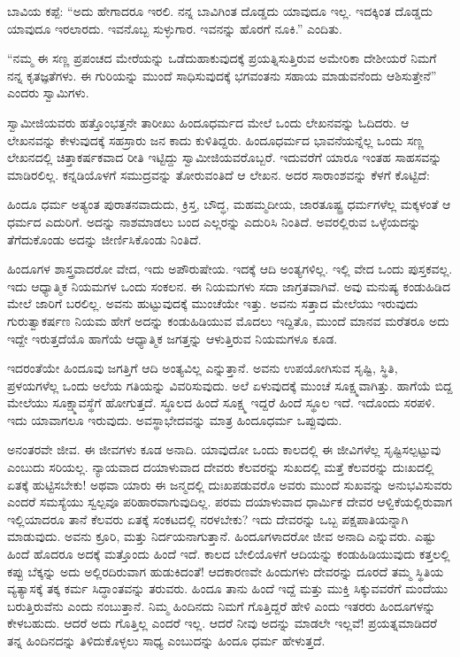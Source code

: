  ಬಾವಿಯ ಕಪ್ಪೆ: “ಅದು ಹೇಗಾದರೂ ಇರಲಿ. ನನ್ನ ಬಾವಿಗಿಂತ ದೊಡ್ಡದು ಯಾವುದೂ ಇಲ್ಲ. ಇದಕ್ಕಿಂತ ದೊಡ್ಡದು ಯಾವುದೂ ಇರಲಾರದು. ಇವನೊಬ್ಬ ಸುಳ್ಳುಗಾರ. ಇವನನ್ನು ಹೊರಗೆ ನೂಕಿ.” ಎಂದಿತು. 

 “ನಮ್ಮ ಈ ಸಣ್ಣ ಪ್ರಪಂಚದ ಮೇರೆಯನ್ನು ಒಡೆದುಹಾಕುವುದಕ್ಕೆ ಪ್ರಯತ್ನಿಸುತ್ತಿರುವ ಅಮೇರಿಕಾ ದೇಶೀಯರೆ ನಿಮಗೆ ನನ್ನ ಕೃತಜ್ಞತೆಗಳು. ಈ ಗುರಿಯನ್ನು ಮುಂದೆ ಸಾಧಿಸುವುದಕ್ಕೆ ಭಗವಂತನು ಸಹಾಯ ಮಾಡುವನೆಂದು ಆಶಿಸುತ್ತೇನೆ” ಎಂದರು ಸ್ವಾಮಿಗಳು. 

 ಸ್ವಾಮೀಜಿಯವರು ಹತ್ತೊಂಭತ್ತನೇ ತಾರೀಖು ಹಿಂದೂಧರ್ಮದ ಮೇಲೆ ಒಂದು ಲೇಖನವನ್ನು ಓದಿದರು. ಆ ಲೇಖನವನ್ನು ಕೇಳುವುದಕ್ಕೆ ಸಹಸ್ರಾರು ಜನ ಕಾದು ಕುಳಿತಿದ್ದರು. ಹಿಂದೂಧರ್ಮದ ಭಾವನೆಯನ್ನೆಲ್ಲ ಒಂದು ಸಣ್ಣ ಲೇಖನದಲ್ಲಿ ಚಿತ್ತಾಕರ್ಷಕವಾದ ರೀತಿ ಇಟ್ಟಿದ್ದು ಸ್ವಾಮೀಜಿಯವರೊಬ್ಬರೆ. ಇದುವರೆಗೆ ಯಾರೂ ಇಂತಹ ಸಾಹಸವನ್ನು ಮಾಡಿರಲಿಲ್ಲ. ಕನ್ನಡಿಯೊಳಗೆ ಸಮುದ್ರವನ್ನು ತೋರುವಂತಿದೆ ಆ ಲೇಖನ. ಅದರ ಸಾರಾಂಶವನ್ನು ಕೆಳಗೆ ಕೊಟ್ಟಿದೆ: 

 ಹಿಂದೂ ಧರ್ಮ ಅತ್ಯಂತ ಪುರಾತನವಾದುದು, ಕ್ರಿಸ್ತ, ಬೌದ್ಧ, ಮಹಮ್ಮದೀಯ, ಜಾರತೂಷ್ಟ್ರ ಧರ್ಮಗಳೆಲ್ಲ ಮಕ್ಕಳಂತೆ ಆ ಧರ್ಮದ ಎದುರಿಗೆ. ಅದನ್ನು ನಾಶಮಾಡಲು ಬಂದ ಎಲ್ಲರನ್ನು ಎದುರಿಸಿ ನಿಂತಿದೆ. ಅವರಲ್ಲಿರುವ ಒಳ್ಳೆಯದನ್ನು ತೆಗೆದುಕೊಂಡು ಅದನ್ನು ಜೀರ್ಣಿಸಿಕೊಂಡು ನಿಂತಿದೆ. 

 ಹಿಂದೂಗಳ ಶಾಸ್ತ್ರವಾದರೋ ವೇದ, ಇದು ಅಪೌರುಷೇಯ. ಇದಕ್ಕೆ ಆದಿ ಅಂತ್ಯಗಳಿಲ್ಲ. ಇಲ್ಲಿ ವೇದ ಒಂದು ಪುಸ್ತಕವಲ್ಲ. ಇದು ಆಧ್ಯಾತ್ಮಿಕ ನಿಯಮಗಳ ಒಂದು ಸಂಕಲನ. ಈ ನಿಯಮಗಳು ಸದಾ ಜಾಗ್ರತವಾಗಿವೆ. ಅವು ಮನುಷ್ಯ ಕಂಡುಹಿಡಿದ ಮೇಲೆ ಜಾರಿಗೆ ಬರಲಿಲ್ಲ. ಅವನು ಹುಟ್ಟುವುದಕ್ಕೆ ಮುಂಚೆಯೇ ಇತ್ತು. ಅವನು ಸತ್ತಾದ ಮೇಲೆಯು ಇರುವುದು ಗುರುತ್ವಾಕರ್ಷಣ ನಿಯಮ ಹೇಗೆ ಅದನ್ನು ಕಂಡುಹಿಡಿಯುವ ಮೊದಲು ಇದ್ದಿತೊ, ಮುಂದೆ ಮಾನವ ಮರೆತರೂ ಅದು ಇದ್ದೇ ಇರುತ್ತದೆಯೊ ಹಾಗೆಯೆ ಆಧ್ಯಾತ್ಮಿಕ ಜಗತ್ತನ್ನು ಆಳುತ್ತಿರುವ ನಿಯಮಗಳೂ ಕೂಡ. 

 ಇದರಂತೆಯೇ ಹಿಂದೂವು ಜಗತ್ತಿಗೆ ಆದಿ ಅಂತ್ಯವಿಲ್ಲ ಎನ್ನುತ್ತಾನೆ. ಅವನು ಉಪಯೋಗಿಸುವ ಸೃಷ್ಟಿ, ಸ್ಥಿತಿ, ಪ್ರಳಯಗಳೆಲ್ಲ ಒಂದು ಅಲೆಯ ಗತಿಯನ್ನು ವಿವರಿಸುವುದು. ಅಲೆ ಏಳುವುದಕ್ಕೆ ಮುಂಚೆ ಸೂಕ್ಷ್ಮವಾಗಿತ್ತು. ಹಾಗೆಯೆ ಬಿದ್ದ ಮೇಲೆಯು ಸೂಕ್ಷ್ಮಾವಸ್ಥೆಗೆ ಹೋಗುತ್ತದೆ. ಸ್ಥೂಲದ ಹಿಂದೆ ಸೂಕ್ಷ್ಮ ಇದ್ದರೆ ಹಿಂದೆ ಸ್ಥೂಲ ಇದೆ. ಇದೊಂದು ಸರಪಳಿ. ಇದು ಯಾವಾಗಲೂ ಇರುವುದು. ಅವಸ್ಥಾಭೇದವನ್ನು ಮಾತ್ರ ಹಿಂದೂಧರ್ಮ ಒಪ್ಪುವುದು. 

 ಅನಂತರವೇ ಜೀವ. ಈ ಜೀವಗಳು ಕೂಡ ಅನಾದಿ. ಯಾವುದೋ ಒಂದು ಕಾಲದಲ್ಲಿ ಈ ಜೀವಿಗಳೆಲ್ಲ ಸೃಷ್ಟಿಸಲ್ಪಟ್ಟುವು ಎಂಬುದು ಸರಿಯಲ್ಲ. ನ್ಯಾಯವಾದ ದಯಾಳುವಾದ ದೇವರು ಕೆಲವರನ್ನು ಸುಖದಲ್ಲಿ ಮತ್ತೆ ಕೆಲವರನ್ನು ದುಃಖದಲ್ಲಿ ಏತಕ್ಕೆ ಹುಟ್ಟಿಸಬೇಕು! ಅಥವಾ ಯಾರು ಈ ಜನ್ಮದಲ್ಲಿ ದುಃಖಪಡುವರೊ ಅವರು ಮುಂದೆ ಸುಖವನ್ನು ಅನುಭವಿಸುವರು ಎಂದರೆ ಸಮಸ್ಯೆಯು ಸ್ವಲ್ಪವೂ ಪರಿಹಾರವಾಗುವುದಿಲ್ಲ. ಪರಮ ದಯಾಳುವಾದ ಧಾರ್ಮಿಕ ದೇವರ ಆಳ್ವಿಕೆಯಲ್ಲಿರುವಾಗ ಇಲ್ಲಿಯಾದರೂ ತಾನೆ ಕೆಲವರು ಏತಕ್ಕೆ ಸಂಕಟದಲ್ಲಿ ನರಳಬೇಕು? ಇದು ದೇವರನ್ನು ಒಬ್ಬ ಪಕ್ಷಪಾತಿಯನ್ನಾಗಿ ಮಾಡುವುದು. ಅವನು ಕ್ರೂರಿ, ಮತ್ತು ನಿರ್ದಯನಾಗುತ್ತಾನೆ. ಹಿಂದೂಗಳಾದರೋ ಜೀವ ಅನಾದಿ ಎನ್ನುವರು. ಎಷ್ಟು ಹಿಂದೆ ಹೊದರೂ ಅದಕ್ಕೆ ಮತ್ತೊಂದು ಹಿಂದೆ ಇದೆ. ಕಾಲದ ಬೇಲಿಯೊಳಗೆ ಆದಿಯನ್ನು ಕಂಡುಹಿಡಿಯುವುದು ಕತ್ತಲಲ್ಲಿ ಕಪ್ಪು ಬೆಕ್ಕನ್ನು ಅದು ಅಲ್ಲಿರದಿರುವಾಗ ಹುಡುಕಿದಂತೆ! ಆದಕಾರಣವೇ ಹಿಂದುಗಳು ದೇವರನ್ನು ದೂರದೆ ತಮ್ಮ ಸ್ಥಿತಿಯ ವ್ಯತ್ಯಾಸಕ್ಕೆ ತಕ್ಕ ಕರ್ಮ ಸಿದ್ಧಾಂತವನ್ನು ತರುವರು. ಹಿಂದೂ ತಾನು ಹಿಂದೆ ಇದ್ದೆ ಮತ್ತು ಮುಕ್ತಿ ಸಿಕ್ಕುವವರೆಗೆ ಮಂದೆಯು ಬರುತ್ತಿರುವೆನು ಎಂದು ನಂಬುತ್ತಾನೆ. ನಿಮ್ಮ ಹಿಂದಿನದು ನಿಮಗೆ ಗೊತ್ತಿದ್ದರೆ ಹೇಳಿ ಎಂದು ಇತರರು ಹಿಂದೂಗಳನ್ನು ಕೇಳಬಹುದು. ಆದರೆ ಅದು ಗೊತ್ತಿಲ್ಲ ಎಂದರೆ ಇಲ್ಲ. ಆದರೆ ನೀವು ಅದನ್ನು ಮಾಡಲೇ ಇಲ್ಲವೆ! ಪ್ರಯತ್ನಮಾಡಿದರೆ ತನ್ನ ಹಿಂದಿನದನ್ನು ತಿಳಿದುಕೊಳ್ಳಲು ಸಾಧ್ಯ ಎಂಬುದನ್ನು ಹಿಂದೂ ಧರ್ಮ ಹೇಳುತ್ತದೆ. 

